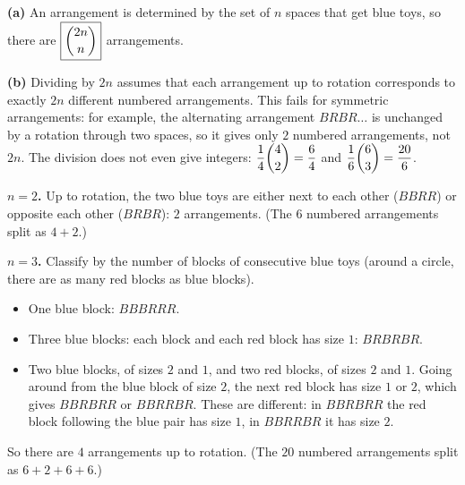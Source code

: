 \textbf{(a)} An arrangement is determined by the set of $n$ spaces that get blue toys, so there are $\boxed{\dbinom{2n}{n}}$ arrangements.

\textbf{(b)} Dividing by $2n$ assumes that each arrangement up to rotation corresponds to exactly $2n$ different numbered arrangements. This fails for symmetric arrangements: for example, the alternating arrangement $BRBR\ldots$ is unchanged by a rotation through two spaces, so it gives only $2$ numbered arrangements, not $2n$. The division does not even give integers: $\dfrac{1}{4}\dbinom42=\dfrac64$ and $\dfrac16\dbinom63=\dfrac{20}{6}$.

\textbf{$n=2$.} Up to rotation, the two blue toys are either next to each other ($BBRR$) or opposite each other ($BRBR$): $\boxed{2}$ arrangements. (The $6$ numbered arrangements split as $4+2$.)

\textbf{$n=3$.} Classify by the number of blocks of consecutive blue toys (around a circle, there are as many red blocks as blue blocks).
\begin{itemize}
\item One blue block: $BBBRRR$.
\item Three blue blocks: each block and each red block has size $1$: $BRBRBR$.
\item Two blue blocks, of sizes $2$ and $1$, and two red blocks, of sizes $2$ and $1$. Going around from the blue block of size $2$, the next red block has size $1$ or $2$, which gives $BBRBRR$ or $BBRRBR$. These are different: in $BBRBRR$ the red block following the blue pair has size $1$, in $BBRRBR$ it has size $2$.
\end{itemize}
So there are $\boxed{4}$ arrangements up to rotation. (The $20$ numbered arrangements split as $6+2+6+6$.)
